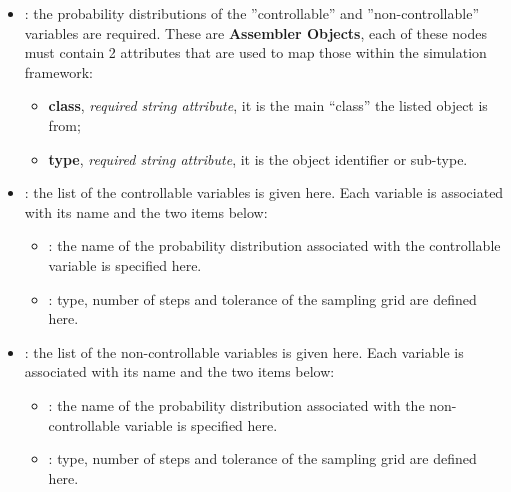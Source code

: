 \begin{itemize}
  	\item {}: the probability distributions of the ''controllable''
  and ''non-controllable'' variables are required.
  These are \textbf{Assembler Objects}, each of these nodes must contain 2
  attributes that are used to map those within the simulation framework:
   		\begin{itemize}
    			\item \textbf{class}, \textit{required string attribute}, it is the main
    ``class'' the listed object is from;
    	 		\item \textbf{type}, \textit{required string attribute}, it is the
    object identifier or sub-type.
		\end{itemize}
  	\item {}: the list of the controllable variables is given here.
  Each variable is associated with its name and the two items below:
		\begin{itemize}
    			\item {}: the name of the probability distribution
    associated with the controllable variable is specified here.
    			\item {}: type, number of steps and tolerance of the sampling grid
    are defined here.
		\end{itemize}
  	\item {}: the list of the non-controllable variables is
  given here.
  Each variable is associated with its name and the two items below:
		\begin{itemize}
    			\item {}: the name of the probability distribution
    associated with the non-controllable variable is specified here.
    			\item {}: type, number of steps and tolerance of the sampling grid
    are defined here.
		\end{itemize}
\end{itemize}

